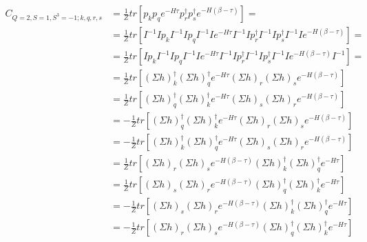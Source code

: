 \begin{equation}
  \begin{aligned}
    C_{Q=2,S=1,S^3=-1;k,q,r,s} &= \frac{1}{Z}tr\left[p_kp_qe^{-H\tau}p^\dagger_rp^\dagger_se^{-H\left(\beta-\tau\right)}\right] = 
    \\
    &= \frac{1}{Z}tr\left[I^{-1}Ip_kI^{-1}Ip_qI^{-1}Ie^{-H\tau}I^{-1}Ip^\dagger_rI^{-1}Ip^\dagger_sI^{-1}Ie^{-H\left(\beta-\tau\right)}\right] = \\
    &= \frac{1}{Z}tr\left[Ip_kI^{-1}Ip_qI^{-1}Ie^{-H\tau}I^{-1}Ip^\dagger_rI^{-1}Ip^\dagger_sI^{-1}Ie^{-H\left(\beta-\tau\right)}I^{-1}\right] = 
    \\
    &= \frac{1}{Z}tr\left[(\Sigma h)^\dagger_k(\Sigma h)^\dagger_qe^{-H\tau}(\Sigma h)_r(\Sigma h)_se^{-H\left(\beta-\tau\right)}\right] 
    \\
    &= \frac{1}{Z}tr\left[(\Sigma h)^\dagger_q(\Sigma h)^\dagger_ke^{-H\tau}(\Sigma h)_s(\Sigma h)_re^{-H\left(\beta-\tau\right)}\right] 
    \\
    &= - \frac{1}{Z}tr\left[(\Sigma h)^\dagger_q(\Sigma h)^\dagger_ke^{-H\tau}(\Sigma h)_r(\Sigma h)_se^{-H\left(\beta-\tau\right)}\right]
    \\
    &= - \frac{1}{Z}tr\left[(\Sigma h)^\dagger_k(\Sigma h)^\dagger_qe^{-H\tau}(\Sigma h)_s(\Sigma h)_re^{-H\left(\beta-\tau\right)}\right] 
    \\
    &= \frac{1}{Z}tr\left[(\Sigma h)_r(\Sigma h)_se^{-H\left(\beta-\tau\right)}(\Sigma h)^\dagger_k(\Sigma h)^\dagger_qe^{-H\tau}\right] 
    \\
    &= \frac{1}{Z}tr\left[(\Sigma h)_s(\Sigma h)_re^{-H\left(\beta-\tau\right)}(\Sigma h)^\dagger_q(\Sigma h)^\dagger_ke^{-H\tau}\right] 
    \\
    &= - \frac{1}{Z}tr\left[(\Sigma h)_s(\Sigma h)_re^{-H\left(\beta-\tau\right)}(\Sigma h)^\dagger_k(\Sigma h)^\dagger_qe^{-H\tau}\right] 
    \\
    &= - \frac{1}{Z}tr\left[(\Sigma h)_r(\Sigma h)_se^{-H\left(\beta-\tau\right)}(\Sigma h)^\dagger_q(\Sigma h)^\dagger_ke^{-H\tau}\right] 
    \\
  \end{aligned}
\end{equation}

